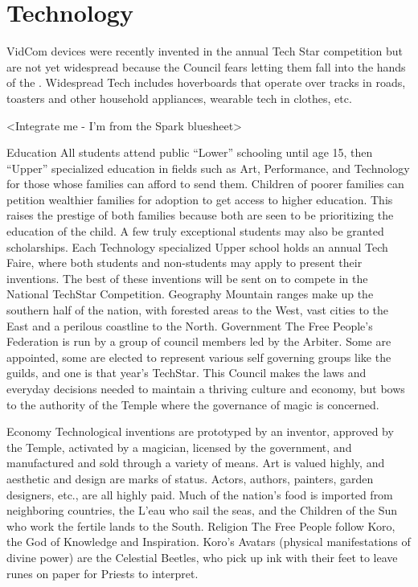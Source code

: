 \documentclass[blue]{GL2020}
\begin{document}
\section*{Technology}
VidCom devices were recently invented in the annual Tech Star competition but are not yet widespread because the Council fears letting them fall into the hands of the \pShippies{}.  Widespread Tech includes hoverboards that operate over tracks in roads, toasters and other household appliances, wearable tech in clothes, etc.  




<Integrate me  \/ - I’m from the Spark bluesheet>

Education
All students attend public “Lower” schooling until age 15, then “Upper” specialized education in fields such as Art, Performance, and Technology for those whose families can afford to send them. Children of poorer families can petition wealthier families for adoption to get access to higher education. This raises the prestige of both families because both are seen to be prioritizing the education of the child. A few truly exceptional students may also be granted scholarships. Each Technology specialized Upper school holds an annual Tech Faire, where both students and non-students may apply to present their inventions. The best of these inventions will be sent on to compete in the National TechStar Competition.
Geography
Mountain ranges make up the southern half of the nation, with forested areas to the West, vast cities to the East and a perilous coastline to the North.
Government
The Free People's Federation is run by a group of council members led by the Arbiter. Some are appointed, some are elected to represent various self governing groups like the guilds, and one is that year’s TechStar.  This Council makes the laws and everyday decisions needed to maintain a thriving culture and economy, but bows to the authority of the Temple where the governance of magic is concerned.

Economy
Technological inventions are prototyped by an inventor, approved by the Temple, activated by a magician, licensed by the government, and manufactured and sold through a variety of means.  Art is valued highly, and aesthetic and design are marks of status. Actors, authors, painters, garden designers, etc., are all highly paid. Much of the nation’s food is imported from neighboring countries, the L’eau who sail the seas, and the Children of the Sun who work the fertile lands to the South.
Religion
The Free People follow Koro, the God of Knowledge and Inspiration.  Koro's Avatars (physical manifestations of divine power) are the Celestial Beetles, who pick up ink with their feet to leave runes on paper for Priests to interpret.
\end{document}
